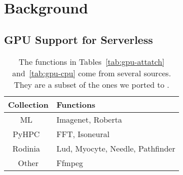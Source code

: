 \section{Background}
\label{sec:bg}

\begin{comment}
\subsection{Serverless}

Serverless control planes execute snippets of user code inside isolated sandboxes, handling data movement and resource allocation needs to service them.
The creation of such function-specific containers costs several seconds on the critical execution path, and is known as a \quotes{cold start}.
To amortize the sandbox startup time, they are kept resident in memory to execute subsequent invocations in a \quotes{container pool}.
A simple one-sized fits all design of assigning an entire GPU to each container breaks down when trying to handle heterogeneous FaaS~\cite{shahrad2020serverless} workloads.
One cannot have a viable container pool when the limited GPUs on a machine are each assigned to a single container.
This results in constant removal of containers to serve new invocations, causing high numbers of cold starts.
Any idle function would also result in significant underutilization of resources -- a major waste of hardware from the provider's perspective.
\end{comment}

\subsection{GPU Support for Serverless}

\begin{table}
  \centering
  \caption{The functions in Tables~\ref{tab:gpu-attatch} and~\ref{tab:gpu-cpu} come from several sources. 
  They are a subset of the ones we ported to \sysname.}
  \label{tab:fun-list}
  \begin{tabular}{c|p{6cm}}
    \hline
    Collection & Functions \\
    \hline
    ML~\cite{kim2019functionbench} & Imagenet, Roberta \\ %
    PyHPC~\cite{pyhpc-bench} & FFT, Isoneural \\ %
    Rodinia~\cite{che2009rodinia} & Lud, Myocyte, Needle, Pathfinder \\ %
    Other & Ffmpeg~\cite{ffmpeg} \\
  \end{tabular}
\end{table}

